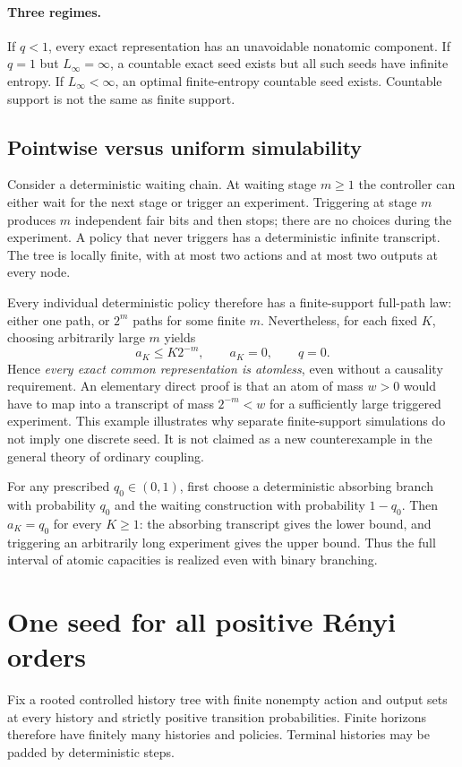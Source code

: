 \documentclass[11pt,a4paper]{article}
\theoremstyle{definition}\newtheorem{definition}[theorem]{Definition}
\theoremstyle{remark}\newtheorem{remark}[theorem]{Remark}
\numberwithin{equation}{section}
\begin{document}
\paragraph{Three regimes.}
If $q<1$, every exact representation has an unavoidable nonatomic
component. If $q=1$ but $L_\infty=\infty$, a countable exact seed exists
but all such seeds have infinite entropy. If $L_\infty<\infty$, an
optimal finite-entropy countable seed exists. Countable support is not
the same as finite support.

\subsection{Pointwise versus uniform simulability}
Consider a deterministic waiting chain. At waiting stage $m\ge1$ the
controller can either wait for the next stage or trigger an experiment.
Triggering at stage $m$ produces $m$ independent fair bits and then
stops; there are no choices during the experiment. A policy that never
triggers has a deterministic infinite transcript. The tree is locally
finite, with at most two actions and at most two outputs at every node.

Every individual deterministic policy therefore has a finite-support
full-path law: either one path, or $2^m$ paths for some finite $m$.
Nevertheless, for each fixed $K$, choosing arbitrarily large $m$ yields
\[
 a_K\le K2^{-m},\qquad a_K=0,\qquad q=0.
\]
Hence \emph{every exact common representation is atomless}, even
without a causality requirement. An elementary direct proof is that
an atom of mass $w>0$ would have to map into a transcript of mass
$2^{-m}<w$ for a sufficiently large triggered experiment.
This example illustrates why separate finite-support simulations do
not imply one discrete seed. It is not claimed as a new counterexample
in the general theory of ordinary coupling.

For any prescribed $q_0\in(0,1)$, first choose a deterministic absorbing
branch with probability $q_0$ and the waiting construction with
probability $1-q_0$. Then $a_K=q_0$ for every $K\ge1$: the absorbing
transcript gives the lower bound, and triggering an arbitrarily long
experiment gives the upper bound. Thus the full interval of atomic
capacities is realized even with binary branching.


\section{One seed for all positive R\'enyi orders}\label{sec:renyi}
Fix a rooted controlled history tree with finite nonempty action and output
sets at every history and strictly positive transition probabilities.
Finite horizons therefore have finitely many histories and policies.
Terminal histories may be padded by deterministic steps.
\end{document}
